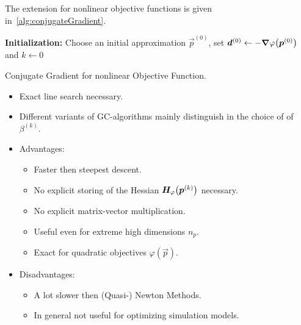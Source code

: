 			The extension for nonlinear objective functions is given in~\autoref{alg:conjugateGradient}.

			\begin{algorithm}  \DontPrintSemicolon
				\textbf{Initialization:} Choose an initial approximation \(\vec{p}^{(0)}\), set \( \bm{d}^{(0)} \gets -\grad{\varphi}\big(\bm{p}^{(0)}\big) \) and \( k \gets 0 \) \;

				\caption{Conjugate Gradient for nonlinear Objective Function.}
				\label{alg:conjugateGradient}
			\end{algorithm}

			\begin{itemize}
				\item Exact line search necessary.
				\item Different variants of GC-algorithms mainly distinguish in the choice of of \( \beta^{(k)} \).
				\item Advantages:
					\begin{itemize}
						\item Faster then steepest descent.
						\item No explicit storing of the Hessian \( \bm{H}_\varphi\big(\bm{p}^{(k)}\big) \) necessary.
						\item No explicit matrix-vector multiplication.
						\item Useful even for extreme high dimensions \( n_p \).
						\item Exact for quadratic objectives \( \varphi(\vec{p}) \).
					\end{itemize}
				\item Disadvantages:
					\begin{itemize}
						\item A lot slower then (Quasi-) Newton Methods.
						\item In general not useful for optimizing simulation models.
					\end{itemize}
			\end{itemize}

